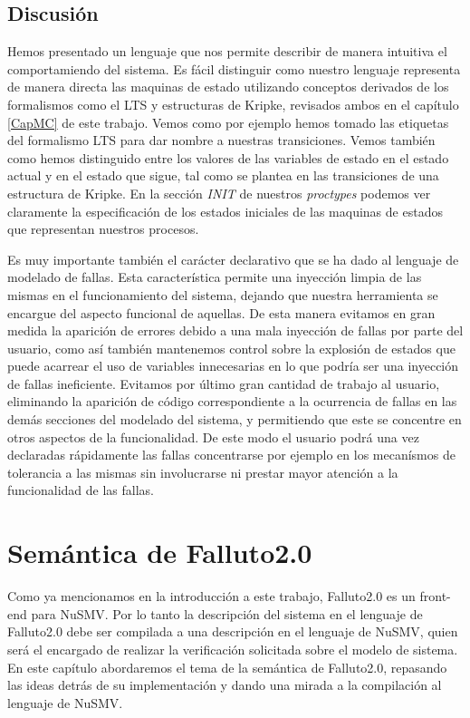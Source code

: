 \documentclass[titlepage, 12pt]{book}
\begin{document}
\section{Discusi\'on}
Hemos presentado un lenguaje que nos permite describir de manera intuitiva el comportamiendo del sistema. Es f\'acil distinguir como nuestro lenguaje representa de manera directa las maquinas de estado utilizando conceptos derivados de los formalismos como el LTS y estructuras de Kripke, revisados ambos en el cap\'itulo \ref{CapMC} de este trabajo. Vemos como por ejemplo hemos tomado las etiquetas del formalismo LTS para dar nombre a nuestras transiciones. Vemos tambi\'en como hemos distinguido entre los valores de las variables de estado en el estado actual y en el estado que sigue, tal como se plantea en las transiciones de una estructura de Kripke. En la secci\'on \textit{INIT} de nuestros \textit{proctypes} podemos ver claramente la especificaci\'on de los estados iniciales de las maquinas de estados que representan nuestros procesos.

Es muy importante tambi\'en el car\'acter declarativo que se ha dado al lenguaje de modelado de fallas. Esta caracter\'istica permite una inyecci\'on limpia de las mismas en el funcionamiento del sistema, dejando que nuestra herramienta se encargue del aspecto funcional de aquellas. De esta manera evitamos en gran medida la aparici\'on de errores debido a una mala inyecci\'on de fallas por parte del usuario, como as\'i tambi\'en mantenemos control sobre la explosi\'on de estados que puede acarrear el uso de variables innecesarias en lo que podr\'ia ser una inyecci\'on de fallas ineficiente. Evitamos por \'ultimo gran cantidad de trabajo al usuario, eliminando la aparici\'on de c\'odigo correspondiente a la ocurrencia de fallas en las dem\'as secciones del modelado del sistema, y permitiendo que este se concentre en otros aspectos de la funcionalidad. De este modo el usuario podr\'a una vez declaradas r\'apidamente las fallas concentrarse por ejemplo en los mecan\'ismos de tolerancia a las mismas sin involucrarse ni prestar mayor atenci\'on a la funcionalidad de las fallas.



\chapter{Sem\'antica de Falluto2.0}
Como ya mencionamos en la introducci\'on a este trabajo, Falluto2.0 es un front-end para NuSMV. Por lo tanto la descripci\'on del sistema en el lenguaje de Falluto2.0 debe ser compilada a una descripci\'on en el lenguaje de NuSMV, quien ser\'a el encargado de realizar la verificaci\'on solicitada sobre el modelo de sistema.  En este cap\'itulo abordaremos el tema de la sem\'antica de Falluto2.0, repasando las ideas detr\'as de su implementaci\'on y dando una mirada a la compilaci\'on al lenguaje de NuSMV.
\end{document}
